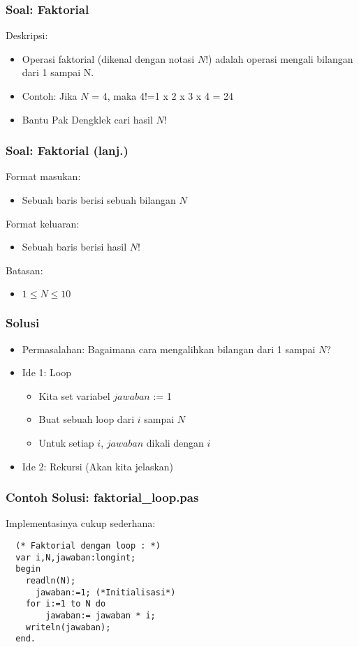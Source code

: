 \documentclass{beamer}
\begin{document}
\begin{frame}
\frametitle{Soal: Faktorial}
Deskripsi:
\begin{itemize}
    \item Operasi faktorial (dikenal dengan notasi $N$!) adalah operasi mengali bilangan dari 1 sampai N.
    \item Contoh: Jika $N$ = 4, maka 4!=1 x 2 x 3 x 4 = 24
    \item Bantu Pak Dengklek cari hasil $N$!
\end{itemize}
\end{frame}

\begin{frame}
\frametitle{Soal: Faktorial (lanj.) }
Format masukan:
\begin{itemize}
    \item Sebuah baris berisi sebuah bilangan $N$
\end{itemize}
Format keluaran:
\begin{itemize}
    \item Sebuah baris berisi hasil $N$!
\end{itemize}
Batasan:
\begin{itemize}
    \item $1 \le N \le 10$
\end{itemize}
\end{frame}

\begin{frame}
\frametitle{Solusi}
\begin{itemize}
    \item Permasalahan: Bagaimana cara mengalihkan bilangan dari 1 sampai $N$?
  \item Ide 1: Loop
  \begin{itemize}
     \item Kita set variabel $jawaban$ := 1
     \item Buat sebuah loop dari $i$ sampai $N$
     \item Untuk setiap $i$, $jawaban$ dikali dengan $i$
   \end{itemize}
   \item Ide 2: Rekursi (Akan kita jelaskan)
\end{itemize}
\end{frame}

\begin{frame}[fragile]
\frametitle{Contoh Solusi: faktorial\_loop.pas}
Implementasinya cukup sederhana:
\begin{lstlisting}
  (* Faktorial dengan loop : *)
  var i,N,jawaban:longint;
  begin
    readln(N);
      jawaban:=1; (*Initialisasi*)
    for i:=1 to N do
        jawaban:= jawaban * i;
    writeln(jawaban);
  end.
\end{lstlisting}
\end{frame}
\end{document}
